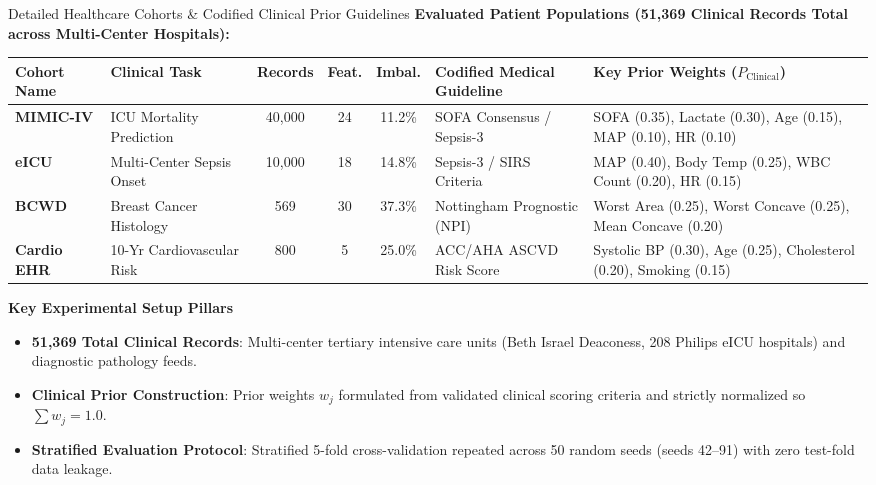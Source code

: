 \documentclass[aspectratio=169,10pt]{beamer}
\begin{document}
\begin{frame}{Detailed Healthcare Cohorts \& Codified Clinical Prior Guidelines}
  \vspace{-0.15cm}
  \textbf{\scriptsize Evaluated Patient Populations (51,369 Clinical Records Total across Multi-Center Hospitals):}
  \vspace{0.05cm}
  \begin{table}[h]
    \centering
    \tiny
    \begin{tabularx}{\textwidth}{llccclX}
      \toprule
      \textbf{Cohort Name} & \textbf{Clinical Task} & \textbf{Records} & \textbf{Feat.} & \textbf{Imbal.} & \textbf{Codified Medical Guideline} & \textbf{Key Prior Weights ($P_{\text{Clinical}}$)} \\
      \midrule
      \textbf{MIMIC-IV} & ICU Mortality Prediction & 40,000 & 24 & 11.2\% & SOFA Consensus / Sepsis-3 & SOFA (0.35), Lactate (0.30), Age (0.15), MAP (0.10), HR (0.10) \\
      \textbf{eICU} & Multi-Center Sepsis Onset & 10,000 & 18 & 14.8\% & Sepsis-3 / SIRS Criteria & MAP (0.40), Body Temp (0.25), WBC Count (0.20), HR (0.15) \\
      \textbf{BCWD} & Breast Cancer Histology & 569 & 30 & 37.3\% & Nottingham Prognostic (NPI) & Worst Area (0.25), Worst Concave (0.25), Mean Concave (0.20) \\
      \textbf{Cardio EHR} & 10-Yr Cardiovascular Risk & 800 & 5 & 25.0\% & ACC/AHA ASCVD Risk Score & Systolic BP (0.30), Age (0.25), Cholesterol (0.20), Smoking (0.15) \\
      \bottomrule
    \end{tabularx}
  \end{table}
  \vspace{-0.15cm}
  \begin{block}{\textbf{Key Experimental Setup Pillars}}
    \scriptsize
    \begin{itemize}\setlength\itemsep{1.5pt}
      \item \textbf{51,369 Total Clinical Records}: Multi-center tertiary intensive care units (Beth Israel Deaconess, 208 Philips eICU hospitals) and diagnostic pathology feeds.
      \item \textbf{Clinical Prior Construction}: Prior weights $w_j$ formulated from validated clinical scoring criteria and strictly normalized so $\sum w_j = 1.0$.
      \item \textbf{Stratified Evaluation Protocol}: Stratified 5-fold cross-validation repeated across 50 random seeds (seeds 42--91) with zero test-fold data leakage.
    \end{itemize}
  \end{block}
\end{frame}
\end{document}
